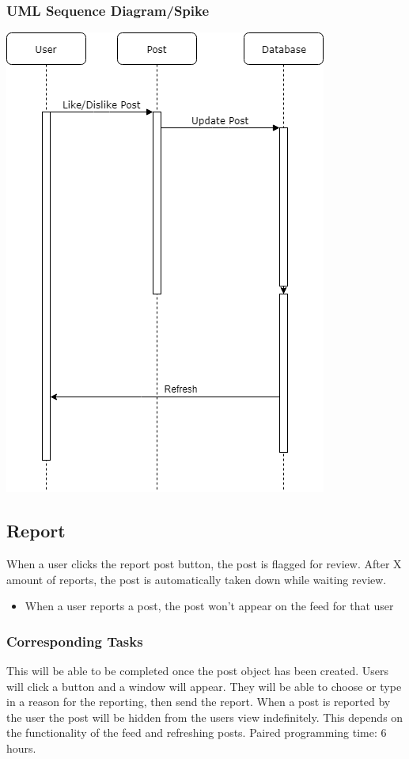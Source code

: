 \documentclass[12pt]{article}
\begin{document}
\subsubsection{UML Sequence Diagram/Spike}
\includegraphics[scale=0.5]{img/3.png}\linebreak

\subsection{Report}
When a user clicks the report post button, the post is flagged for review. After
X amount of reports, the post is automatically taken down while waiting review.
\begin{itemize}
  \item When a user reports a post, the post won’t appear on the feed for that user
\end{itemize}
\subsubsection{Corresponding Tasks}
	This will be able to be completed once the post object has been created.  Users will click a button and a window will appear.  They will be able to choose or type in a reason for the reporting, then send the report.  When a post is reported by the user the post will be hidden from the users view indefinitely.  This depends on the functionality of the feed and refreshing posts.  Paired programming time: 6 hours.
\end{document}
